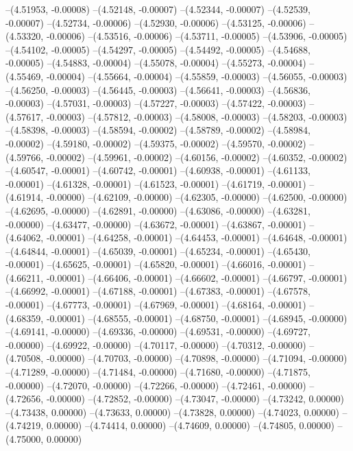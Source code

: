 --(4.51953, -0.00008)
--(4.52148, -0.00007)
--(4.52344, -0.00007)
--(4.52539, -0.00007)
--(4.52734, -0.00006)
--(4.52930, -0.00006)
--(4.53125, -0.00006)
--(4.53320, -0.00006)
--(4.53516, -0.00006)
--(4.53711, -0.00005)
--(4.53906, -0.00005)
--(4.54102, -0.00005)
--(4.54297, -0.00005)
--(4.54492, -0.00005)
--(4.54688, -0.00005)
--(4.54883, -0.00004)
--(4.55078, -0.00004)
--(4.55273, -0.00004)
--(4.55469, -0.00004)
--(4.55664, -0.00004)
--(4.55859, -0.00003)
--(4.56055, -0.00003)
--(4.56250, -0.00003)
--(4.56445, -0.00003)
--(4.56641, -0.00003)
--(4.56836, -0.00003)
--(4.57031, -0.00003)
--(4.57227, -0.00003)
--(4.57422, -0.00003)
--(4.57617, -0.00003)
--(4.57812, -0.00003)
--(4.58008, -0.00003)
--(4.58203, -0.00003)
--(4.58398, -0.00003)
--(4.58594, -0.00002)
--(4.58789, -0.00002)
--(4.58984, -0.00002)
--(4.59180, -0.00002)
--(4.59375, -0.00002)
--(4.59570, -0.00002)
--(4.59766, -0.00002)
--(4.59961, -0.00002)
--(4.60156, -0.00002)
--(4.60352, -0.00002)
--(4.60547, -0.00001)
--(4.60742, -0.00001)
--(4.60938, -0.00001)
--(4.61133, -0.00001)
--(4.61328, -0.00001)
--(4.61523, -0.00001)
--(4.61719, -0.00001)
--(4.61914, -0.00000)
--(4.62109, -0.00000)
--(4.62305, -0.00000)
--(4.62500, -0.00000)
--(4.62695, -0.00000)
--(4.62891, -0.00000)
--(4.63086, -0.00000)
--(4.63281, -0.00000)
--(4.63477, -0.00000)
--(4.63672, -0.00001)
--(4.63867, -0.00001)
--(4.64062, -0.00001)
--(4.64258, -0.00001)
--(4.64453, -0.00001)
--(4.64648, -0.00001)
--(4.64844, -0.00001)
--(4.65039, -0.00001)
--(4.65234, -0.00001)
--(4.65430, -0.00001)
--(4.65625, -0.00001)
--(4.65820, -0.00001)
--(4.66016, -0.00001)
--(4.66211, -0.00001)
--(4.66406, -0.00001)
--(4.66602, -0.00001)
--(4.66797, -0.00001)
--(4.66992, -0.00001)
--(4.67188, -0.00001)
--(4.67383, -0.00001)
--(4.67578, -0.00001)
--(4.67773, -0.00001)
--(4.67969, -0.00001)
--(4.68164, -0.00001)
--(4.68359, -0.00001)
--(4.68555, -0.00001)
--(4.68750, -0.00001)
--(4.68945, -0.00000)
--(4.69141, -0.00000)
--(4.69336, -0.00000)
--(4.69531, -0.00000)
--(4.69727, -0.00000)
--(4.69922, -0.00000)
--(4.70117, -0.00000)
--(4.70312, -0.00000)
--(4.70508, -0.00000)
--(4.70703, -0.00000)
--(4.70898, -0.00000)
--(4.71094, -0.00000)
--(4.71289, -0.00000)
--(4.71484, -0.00000)
--(4.71680, -0.00000)
--(4.71875, -0.00000)
--(4.72070, -0.00000)
--(4.72266, -0.00000)
--(4.72461, -0.00000)
--(4.72656, -0.00000)
--(4.72852, -0.00000)
--(4.73047, -0.00000)
--(4.73242, 0.00000)
--(4.73438, 0.00000)
--(4.73633, 0.00000)
--(4.73828, 0.00000)
--(4.74023, 0.00000)
--(4.74219, 0.00000)
--(4.74414, 0.00000)
--(4.74609, 0.00000)
--(4.74805, 0.00000)
--(4.75000, 0.00000)
